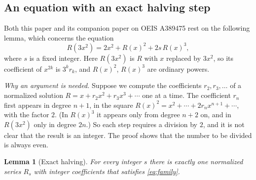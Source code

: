 \documentclass[11pt,a4paper]{article}
\newtheorem{lemma}[theorem]{Lemma}
\theoremstyle{definition}
\theoremstyle{remark}
\begin{document}
\subsection{An equation with an exact halving step}
Both this paper and its companion paper on OEIS A389475 rest on the following lemma, which concerns the
equation
\begin{equation}\label{eq:family}
R(3x^2)=2x^2+R(x)^2+2s\,R(x)^3 ,
\end{equation}
where $s$ is a fixed integer. Here $R(3x^2)$ is $R$ with $x$ replaced by $3x^2$, so its coefficient of $x^{2k}$ is
$3^kr_k$, and $R(x)^2$, $R(x)^3$ are ordinary powers.

\emph{Why an argument is needed.} Suppose we compute the coefficients $r_2,r_3,\dots$ of a normalized
solution $R=x+r_2x^2+r_3x^3+\cdots$ one at a time. The coefficient $r_n$ first appears in degree $n+1$, in the square
$R(x)^2=x^2+\cdots+2r_nx^{n+1}+\cdots$, with the factor $2$. (In $R(x)^3$ it appears only from degree $n+2$ on, and in
$R(3x^2)$ only in degree $2n$.) So each step requires a division by $2$, and it is not clear that the result is an
integer. The proof shows that the number to be divided is always even.

\begin{lemma}[Exact halving]\label{lem:family}
For every integer $s$ there is exactly one normalized series $R_s$ with integer coefficients that satisfies
\eqref{eq:family}.
\end{lemma}
\end{document}
